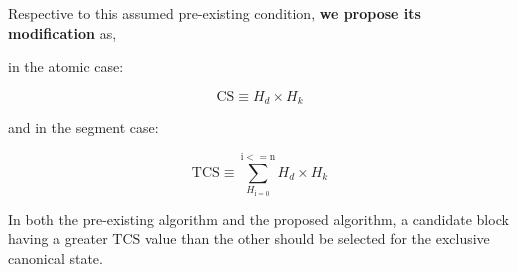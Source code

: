 \documentclass[11pt]{article}
\theoremstyle{plain}
\begin{document}
Respective to this assumed pre-existing condition, \textbf{we propose its modification} as,

in the atomic case:

\begin{equation}
\mathrm{CS} \equiv H_d \times H_k
\end{equation}

and in the segment case:

\begin{equation}
\mathrm{TCS} \equiv \sum_{H_\mathrm{i = 0}}^{\mathrm{i <= n}} H_d \times H_k
\end{equation}

In both the pre-existing algorithm and the proposed algorithm, a candidate
block having a greater $\mathrm{TCS}$ value than the other should be selected for
the exclusive canonical state.
\end{document}
